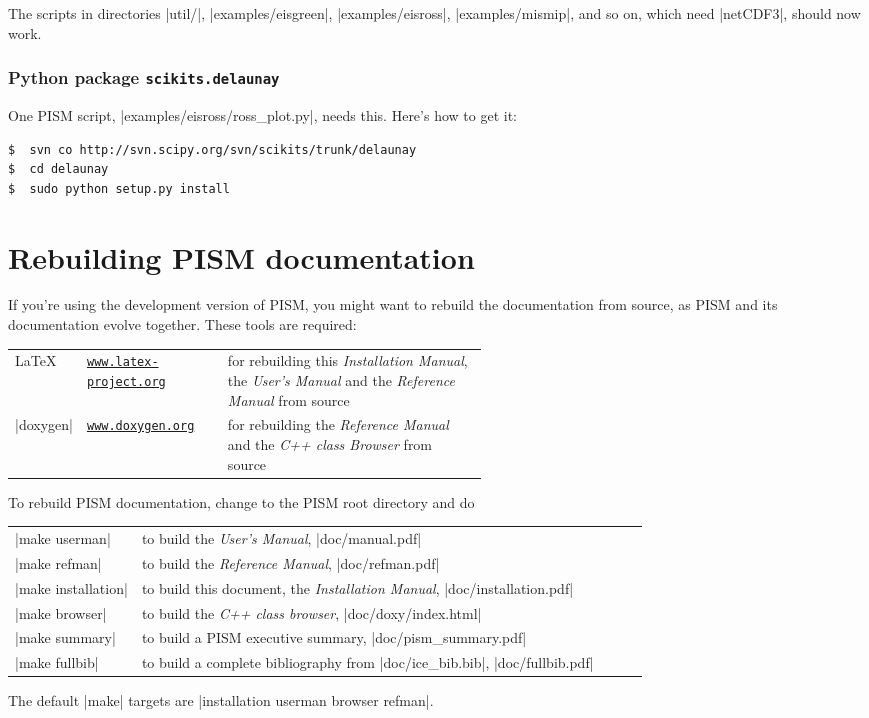 \documentclass[11pt,final]{amsart}
\renewcommand{\t}[1]{\texttt{#1}}
\begin{document}
The scripts in directories |util/|, |examples/eisgreen|, |examples/eisross|, |examples/mismip|, and so on, which need |netCDF3|, should now work.


\subsubsection*{Python package \texttt{scikits.delaunay}}  One PISM script, |examples/eisross/ross_plot.py|, needs this.  Here's how to get it:
\begin{verbatim}
$  svn co http://svn.scipy.org/svn/scikits/trunk/delaunay
$  cd delaunay
$  sudo python setup.py install
\end{verbatim}


\newpage
\section{Rebuilding PISM documentation}
\label{sec:docs}

If you're using the development version of PISM, you might want to rebuild the documentation from source, as PISM and its documentation evolve together.  These tools are required:
\bigskip
\begin{center}
  \begin{tabular*}{0.9\linewidth}{llp{0.55\linewidth}}
    \hline
    \LaTeX & \href{http://www.latex-project.org/}{\t{www.latex-project.org}} &  for rebuilding this \emph{Installation Manual}, the \emph{User's Manual} and the \emph{Reference Manual} from source\\
    |doxygen|\index{doxygen} & \href{http://www.stack.nl/~dimitri/doxygen/}{\t{www.doxygen.org}} &  for rebuilding the \emph{Reference Manual} and the \emph{C++ class Browser} from source  \\
    \hline
  \end{tabular*}
\end{center}
\bigskip
\noindent To rebuild PISM documentation, change to the PISM root directory and do
\begin{center}
  \begin{tabular*}{0.9\linewidth}{lp{0.8\linewidth}}
    |make userman| & to build the \emph{User's Manual}, |doc/manual.pdf|\\
    |make refman| & to build the \emph{Reference Manual}, |doc/refman.pdf|\\
    |make installation| & to build this document, the \emph{Installation Manual}, |doc/installation.pdf|\\
    |make browser| & to build the \emph{C++ class browser}, |doc/doxy/index.html|\\
    |make summary| & to build a PISM executive summary, |doc/pism_summary.pdf|\\
    |make fullbib| & to build  a complete bibliography from |doc/ice_bib.bib|, |doc/fullbib.pdf|
  \end{tabular*}
\end{center}
The default |make| targets are |installation userman browser refman|.
\end{document}
